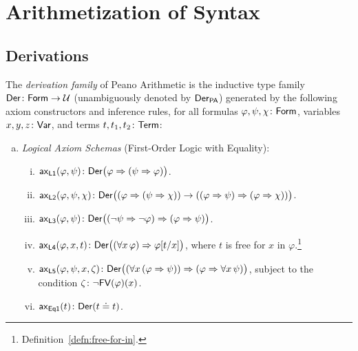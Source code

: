 \chapter{Arithmetization of Syntax}

\section{Derivations}

\begin{defn}[Derivations]
    The \textsl{derivation family} of Peano Arithmetic is the inductive type family $\fun{Der}\colon\fun{Form}\to\univ$ (unambiguously denoted by $\mathsf{Der}_{\mathsf{PA}}$) generated by the following axiom constructors and inference rules, for all formulas $\varphi,\psi,\chi\colon\fun{Form}$, variables $x,y,z\colon\fun{Var}$, and terms $t,t_1,t_2\colon\fun{Term}$:
    \begin{enumerate}[a),font=\upshape]
        \item \textsl{Logical Axiom Schemas} (First-Order Logic with Equality):
        \begin{enumerate}[i),font=\upshape]
            \item $\fun{ax}_{\fun{L1}}(\varphi,\psi)\colon\fun{Der}\bigl(\varphi\imp(\psi\imp\varphi)\bigr)$.
            
            \item $\fun{ax}_{\fun{L2}}(\varphi,\psi,\chi)\colon\fun{Der}\bigl((\varphi\imp(\psi\imp\chi))\to((\varphi\imp\psi)\imp(\varphi\imp\chi))\bigr)$.
            
            \item $\fun{ax}_{\fun{L3}}(\varphi,\psi)\colon\fun{Der}\bigl((\neg\psi\imp\neg\varphi)\imp(\varphi\imp\psi)\bigr)$.
            
            \item $\fun{ax}_{\fun{L4}}(\varphi,x,t)\colon\fun{Der}\bigl((\forall x\,\varphi)\imp\varphi[t/x]\bigr)$, where $t$ is free for $x$ in $\varphi$.\footnote{Definition~\ref{defn:free-for-in}.}
            
            \item $\fun{ax}_{\fun{L5}}(\varphi,\psi,x,\zeta)\colon\fun{Der}\bigl((\forall x\,(\varphi\imp\psi))\imp(\varphi\imp\forall x\,\psi)\bigr)$, subject to the condition $\zeta\colon\neg\fun{FV}(\varphi)(x)$.
            
            \item $\fun{ax}_{\fun{Eq1}}(t)\colon\fun{Der}(t\doteq t)$.
            

\end{enumerate}
\end{enumerate}
\end{defn}
